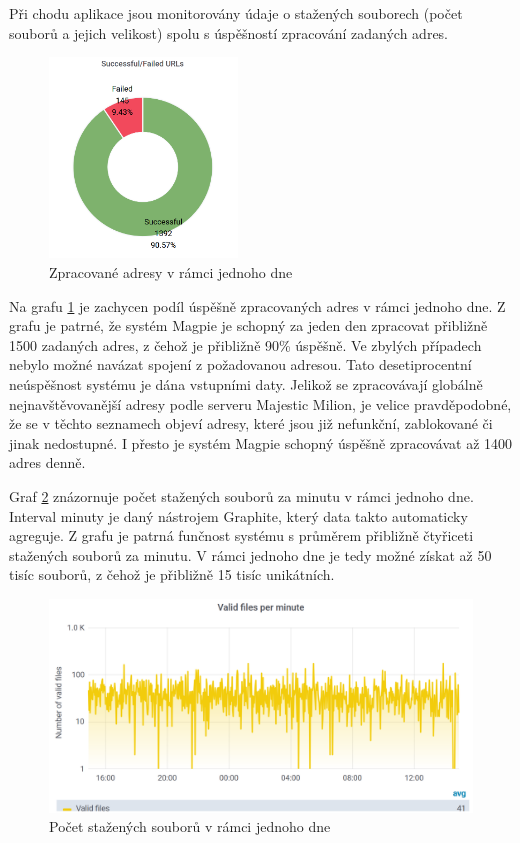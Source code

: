 \documentclass[thesis=M,czech,hidelinks]{FITthesis}[2013/05/06]
\begin{document}
Při chodu aplikace jsou monitorovány údaje o stažených souborech (počet souborů a jejich velikost) spolu s úspěšností zpracování zadaných adres. 

\begin{figure}[h]
	\centering
	\includegraphics[width=5cm]{pictures/URLgraph.png}
	\caption{Zpracované adresy v rámci jednoho dne}
	\label{fig:urls}
\end{figure}

Na grafu \ref{fig:urls} je zachycen podíl úspěšně zpracovaných adres v rámci jednoho dne. Z grafu je patrné, že systém Magpie je schopný za jeden den zpracovat přibližně 1500 zadaných adres, z čehož je přibližně 90\% úspěšně. Ve zbylých případech nebylo možné navázat spojení z požadovanou adresou. Tato  desetiprocentní neúspěšnost systému je dána vstupními daty. Jelikož se zpracovávají globálně nejnavštěvovanější adresy podle serveru Majestic Milion, je velice pravděpodobné, že se v těchto seznamech objeví adresy, které jsou již nefunkční, zablokované či jinak nedostupné. I přesto je systém Magpie schopný úspěšně zpracovávat až 1400 adres denně.

Graf \ref{fig:files2} znázornuje počet stažených souborů za minutu v rámci jednoho dne. Interval minuty je daný nástrojem Graphite, který data takto automaticky agreguje. Z grafu je patrná funčnost systému s průměrem přibližně čtyřiceti stažených souborů za minutu. V rámci jednoho dne je tedy možné získat až 50 tisíc souborů, z čehož je přibližně 15 tisíc unikátních.


\begin{figure}[h]
	\centering
	\includegraphics[width=12cm]{pictures/files3.png}
	\caption{Počet stažených souborů v rámci jednoho dne}
	\label{fig:files2}
\end{figure}
\end{document}
